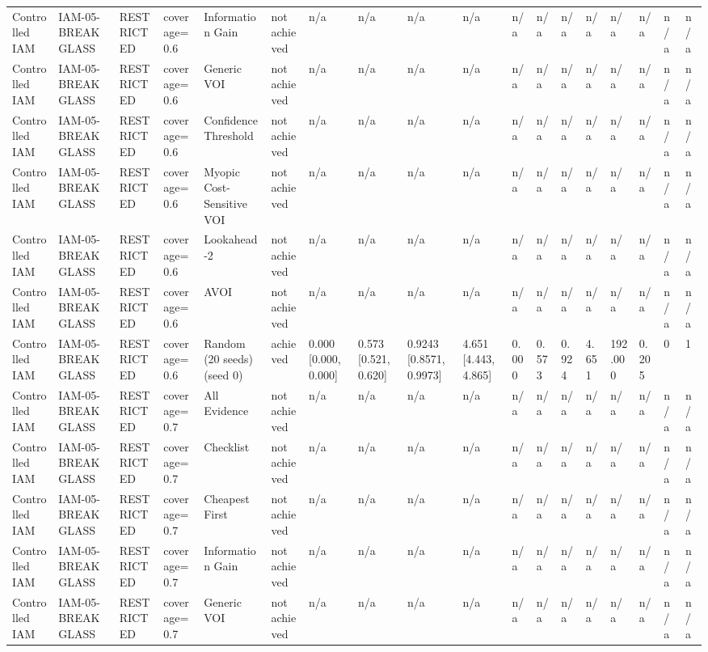 \begin{table}[!ht]
{\begin{tabular}{llllllllllllllllll}
Controlled IAM & IAM-05-BREAKGLASS & RESTRICTED & coverage=0.6 & Information Gain & not achieved & n/a & n/a & n/a & n/a & n/a & n/a & n/a & n/a & n/a & n/a & n/a & n/a \\
Controlled IAM & IAM-05-BREAKGLASS & RESTRICTED & coverage=0.6 & Generic VOI & not achieved & n/a & n/a & n/a & n/a & n/a & n/a & n/a & n/a & n/a & n/a & n/a & n/a \\
Controlled IAM & IAM-05-BREAKGLASS & RESTRICTED & coverage=0.6 & Confidence Threshold & not achieved & n/a & n/a & n/a & n/a & n/a & n/a & n/a & n/a & n/a & n/a & n/a & n/a \\
Controlled IAM & IAM-05-BREAKGLASS & RESTRICTED & coverage=0.6 & Myopic Cost-Sensitive VOI & not achieved & n/a & n/a & n/a & n/a & n/a & n/a & n/a & n/a & n/a & n/a & n/a & n/a \\
Controlled IAM & IAM-05-BREAKGLASS & RESTRICTED & coverage=0.6 & Lookahead-2 & not achieved & n/a & n/a & n/a & n/a & n/a & n/a & n/a & n/a & n/a & n/a & n/a & n/a \\
Controlled IAM & IAM-05-BREAKGLASS & RESTRICTED & coverage=0.6 & AVOI & not achieved & n/a & n/a & n/a & n/a & n/a & n/a & n/a & n/a & n/a & n/a & n/a & n/a \\
Controlled IAM & IAM-05-BREAKGLASS & RESTRICTED & coverage=0.6 & Random (20 seeds) (seed 0) & achieved & 0.000 [0.000, 0.000] & 0.573 [0.521, 0.620] & 0.9243 [0.8571, 0.9973] & 4.651 [4.443, 4.865] & 0.000 & 0.573 & 0.924 & 4.651 & 192.000 & 0.205 & 0 & 1 \\
Controlled IAM & IAM-05-BREAKGLASS & RESTRICTED & coverage=0.7 & All Evidence & not achieved & n/a & n/a & n/a & n/a & n/a & n/a & n/a & n/a & n/a & n/a & n/a & n/a \\
Controlled IAM & IAM-05-BREAKGLASS & RESTRICTED & coverage=0.7 & Checklist & not achieved & n/a & n/a & n/a & n/a & n/a & n/a & n/a & n/a & n/a & n/a & n/a & n/a \\
Controlled IAM & IAM-05-BREAKGLASS & RESTRICTED & coverage=0.7 & Cheapest First & not achieved & n/a & n/a & n/a & n/a & n/a & n/a & n/a & n/a & n/a & n/a & n/a & n/a \\
Controlled IAM & IAM-05-BREAKGLASS & RESTRICTED & coverage=0.7 & Information Gain & not achieved & n/a & n/a & n/a & n/a & n/a & n/a & n/a & n/a & n/a & n/a & n/a & n/a \\
Controlled IAM & IAM-05-BREAKGLASS & RESTRICTED & coverage=0.7 & Generic VOI & not achieved & n/a & n/a & n/a & n/a & n/a & n/a & n/a & n/a & n/a & n/a & n/a & n/a \\

\end{tabular}}
\end{table}
